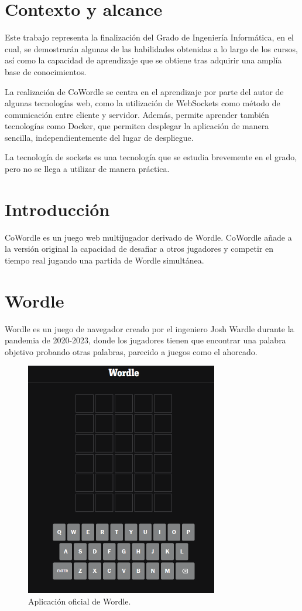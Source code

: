 \section{Contexto y alcance}

Este trabajo representa la finalización del Grado de Ingeniería Informática, en el cual, se demostrarán algunas de las habilidades obtenidas a lo largo de los cursos, así como la capacidad de aprendizaje que se obtiene tras adquirir una amplía base de conocimientos.

La realización de CoWordle se centra en el aprendizaje por parte del autor de algunas tecnologías web, como la utilización de WebSockets como método de comunicación entre cliente y servidor.  Además, permite aprender también tecnologías como Docker, que permiten desplegar la aplicación de manera sencilla, independientemente del lugar de despliegue.

La tecnología de sockets es una tecnología que se estudia brevemente en el grado, pero no se llega a utilizar de manera práctica.


\section{Introducción}
CoWordle es un juego web multijugador derivado de Wordle. CoWordle añade a la versión original la capacidad de desafiar a otros jugadores y competir en tiempo real jugando una partida de Wordle simultánea.


\section{Wordle}
Wordle es un juego de navegador creado por el ingeniero Josh Wardle durante la pandemia de 2020-2023, donde los jugadores tienen que encontrar una palabra objetivo probando otras palabras, parecido a juegos como el ahorcado.

\begin{figure}
	\centering
	\includegraphics[clip=true, width=0.75\textwidth]{images/wordle.png}
	\caption{Aplicación oficial de Wordle.}
	\label{fig:wordle_app}
\end{figure}


